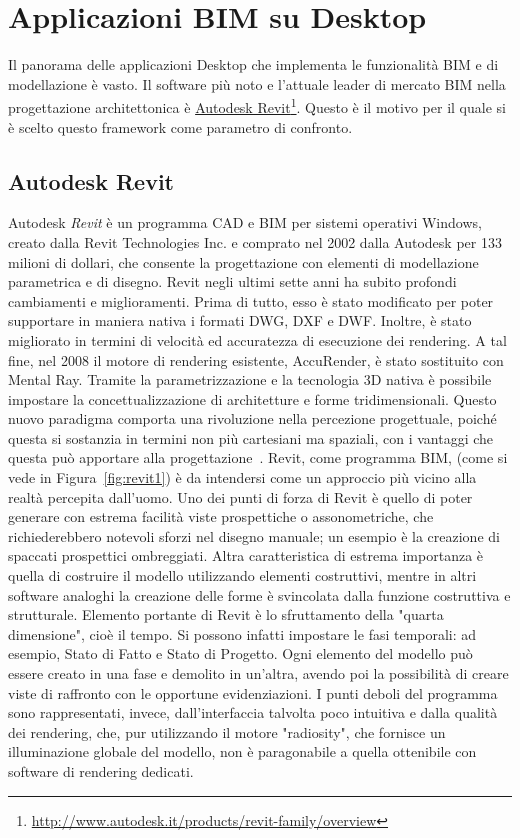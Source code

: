 \section{Applicazioni BIM su Desktop}
\label{sec:chapter_1_section_2}
Il panorama delle applicazioni Desktop che implementa le funzionalità BIM e di modellazione è vasto.
Il software più noto e l’attuale leader di mercato BIM nella
progettazione architettonica è
\href{http://www.autodesk.it/products/revit-family/overview}{Autodesk Revit}\footnote{\url{http://www.autodesk.it/products/revit-family/overview}}.
Questo è il motivo per il quale si è scelto questo framework come parametro di confronto.

\subsection*{Autodesk Revit}
\label{sec:chapter_1_section_2_sub_1}
Autodesk \emph{Revit} è un programma CAD e BIM per sistemi operativi Windows, creato dalla Revit Technologies Inc. e comprato
nel 2002 dalla Autodesk per 133 milioni di dollari, che consente la progettazione con elementi di modellazione parametrica
e di disegno.
Revit negli ultimi sette anni ha subito profondi cambiamenti e miglioramenti. Prima di tutto, esso è stato modificato per poter
supportare in maniera nativa i formati DWG, DXF e DWF. Inoltre, è stato migliorato in termini di velocità ed accuratezza di
esecuzione dei rendering. A tal fine, nel 2008 il motore di rendering esistente, AccuRender, è stato sostituito con Mental Ray.
Tramite la parametrizzazione e la tecnologia 3D nativa è possibile impostare la concettualizzazione di architetture e forme
tridimensionali. Questo nuovo paradigma comporta una rivoluzione nella percezione progettuale, poiché questa si sostanzia in
termini non più cartesiani ma spaziali, con i vantaggi che questa può apportare alla progettazione~\cite{BIMrevolution}.
Revit, come programma BIM, (come si vede in Figura~\ref{fig:revit1}) è da intendersi come un approccio più vicino alla realtà
percepita dall'uomo.
Uno dei punti di forza di Revit è quello di poter generare con estrema facilità viste prospettiche o assonometriche, che
richiederebbero notevoli sforzi nel disegno manuale; un esempio è la creazione di spaccati prospettici ombreggiati.
Altra caratteristica di estrema importanza è quella di costruire il modello utilizzando elementi costruttivi, mentre
in altri software analoghi la creazione delle forme è svincolata dalla funzione costruttiva e strutturale.
Elemento portante di Revit è lo sfruttamento della "quarta dimensione", cioè il tempo. Si possono infatti impostare le fasi
temporali: ad esempio, Stato di Fatto e Stato di Progetto. Ogni elemento del modello può essere creato in una fase e demolito
in un'altra, avendo poi la possibilità di creare viste di raffronto con le opportune evidenziazioni.
I punti deboli del programma sono rappresentati, invece, dall'interfaccia talvolta poco intuitiva e dalla qualità dei rendering,
che, pur utilizzando il motore "radiosity", che fornisce un illuminazione globale del modello, non è paragonabile
a quella ottenibile con software di rendering dedicati.\\


